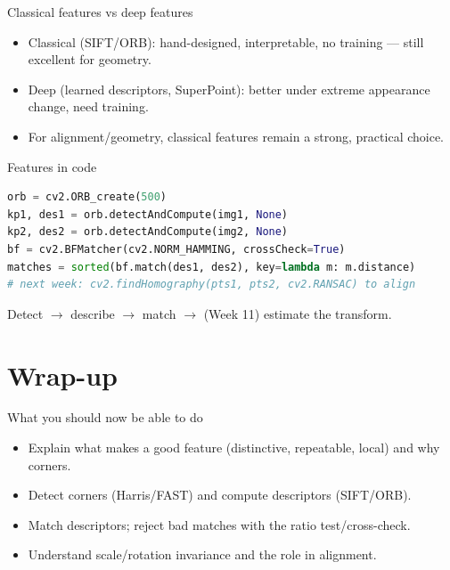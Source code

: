 \documentclass[10pt,aspectratio=169]{beamer}
\begin{document}
\begin{frame}{Classical features vs deep features}
  \begin{itemize}
    \item Classical (SIFT/ORB): hand-designed, interpretable, no training — still excellent for geometry.
    \item Deep (learned descriptors, SuperPoint): better under extreme appearance change, need training.
    \item For alignment/geometry, classical features remain a strong, practical choice.
  \end{itemize}
\end{frame}

\begin{frame}[fragile]{Features in code}
\begin{lstlisting}[language=Python]
orb = cv2.ORB_create(500)
kp1, des1 = orb.detectAndCompute(img1, None)
kp2, des2 = orb.detectAndCompute(img2, None)
bf = cv2.BFMatcher(cv2.NORM_HAMMING, crossCheck=True)
matches = sorted(bf.match(des1, des2), key=lambda m: m.distance)
# next week: cv2.findHomography(pts1, pts2, cv2.RANSAC) to align
\end{lstlisting}
  Detect $\rightarrow$ describe $\rightarrow$ match $\rightarrow$ (Week 11) estimate the transform.
\end{frame}

\section{Wrap-up}

\begin{frame}{What you should now be able to do}
  \begin{itemize}
    \item Explain what makes a good feature (distinctive, repeatable, local) and why corners.
    \item Detect corners (Harris/FAST) and compute descriptors (SIFT/ORB).
    \item Match descriptors; reject bad matches with the ratio test/cross-check.
    \item Understand scale/rotation invariance and the role in alignment.
  \end{itemize}
\end{frame}
\end{document}
